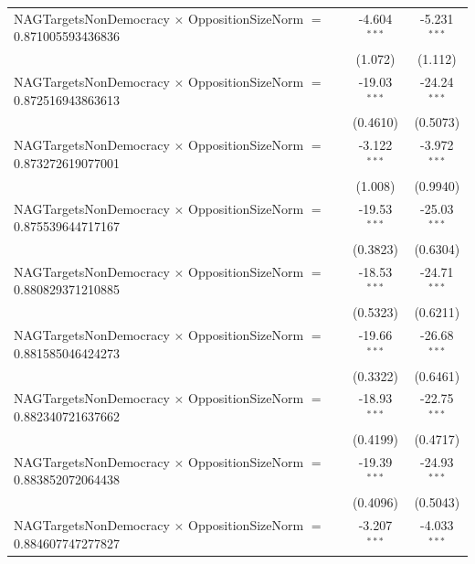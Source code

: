 \begin{tabular}{lcc}
   NAGTargetsNonDemocracy $\times$ OppositionSizeNorm $=$ 0.871005593436836     & -4.604$^{***}$       & -5.231$^{***}$\\   
                                                                                & (1.072)              & (1.112)\\   
   NAGTargetsNonDemocracy $\times$ OppositionSizeNorm $=$ 0.872516943863613     & -19.03$^{***}$       & -24.24$^{***}$\\   
                                                                                & (0.4610)             & (0.5073)\\   
   NAGTargetsNonDemocracy $\times$ OppositionSizeNorm $=$ 0.873272619077001     & -3.122$^{***}$       & -3.972$^{***}$\\   
                                                                                & (1.008)              & (0.9940)\\   
   NAGTargetsNonDemocracy $\times$ OppositionSizeNorm $=$ 0.875539644717167     & -19.53$^{***}$       & -25.03$^{***}$\\   
                                                                                & (0.3823)             & (0.6304)\\   
   NAGTargetsNonDemocracy $\times$ OppositionSizeNorm $=$ 0.880829371210885     & -18.53$^{***}$       & -24.71$^{***}$\\   
                                                                                & (0.5323)             & (0.6211)\\   
   NAGTargetsNonDemocracy $\times$ OppositionSizeNorm $=$ 0.881585046424273     & -19.66$^{***}$       & -26.68$^{***}$\\   
                                                                                & (0.3322)             & (0.6461)\\   
   NAGTargetsNonDemocracy $\times$ OppositionSizeNorm $=$ 0.882340721637662     & -18.93$^{***}$       & -22.75$^{***}$\\   
                                                                                & (0.4199)             & (0.4717)\\   
   NAGTargetsNonDemocracy $\times$ OppositionSizeNorm $=$ 0.883852072064438     & -19.39$^{***}$       & -24.93$^{***}$\\   
                                                                                & (0.4096)             & (0.5043)\\   
   NAGTargetsNonDemocracy $\times$ OppositionSizeNorm $=$ 0.884607747277827     & -3.207$^{***}$       & -4.033$^{***}$\\   

\end{tabular}
